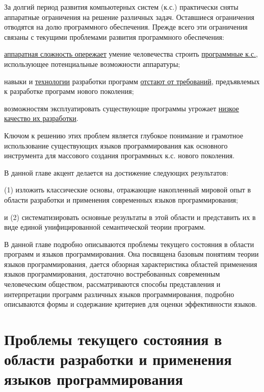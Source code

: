 За долгий период развития компьютерных систем (к.с.) практически сняты аппаратные ограничения на решение различных задач. Оставшиеся ограничения отводятся на долю программного обеспечения. Прежде всего эти ограничения связаны с текущими проблемами развития программного обеспечения:
\begin{textitemize}
    \item \underline{аппаратная сложность опережает} умение человечества строить \underline{программные к.с.}, использующее потенциальные возможности аппаратуры;
    \item навыки и \underline{технологии} разработки программ \underline{отстают от требований}, предъявлемых к разработке программ нового поколения;
    \item возможностям эксплуатировать существующие программы угрожает \underline{низкое качество их разработки}.
\end{textitemize}

Ключом к решению этих проблем является глубокое понимание и грамотное использование существующих языков программирования как основного инструмента для массового создания программных к.с. нового поколения.

В данной главе акцент делается на достижение следующих результатов:
\begin{textitemize}
    \item (1) изложить классические основы, отражающие накопленный мировой опыт в области разработки и применения современных языков программирования;
    \item и (2) систематизировать основные результаты в этой области и представить их в виде единой унифицированной семантической теории программ.
\end{textitemize}

В данной главе подробно описываются проблемы текущего состояния в области программ и языков программирования. Она посвящена базовым понятиям теории языков программирования, дается обзорная характеристика областей применения языков программирования, достаточно востребованных современным человеческим обществом, рассматриваются способы представления и интерпретации программ различных языков программирования, подробно описываются формы и содержание критериев для оценки эффективности языков.

\section{Проблемы текущего состояния в области разработки и применения языков программирования}
\label{sec_programs_problems_and_tasks}


